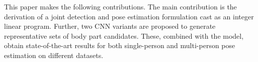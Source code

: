   This paper makes the following contributions. The main
  contribution is the derivation of a joint detection and pose estimation
  formulation cast as an integer linear program.
  Further, two CNN variants are proposed to generate
  representative sets of body part candidates. These, combined with the
  model, obtain state-of-the-art results for both single-person and
  multi-person pose estimation on different datasets.




